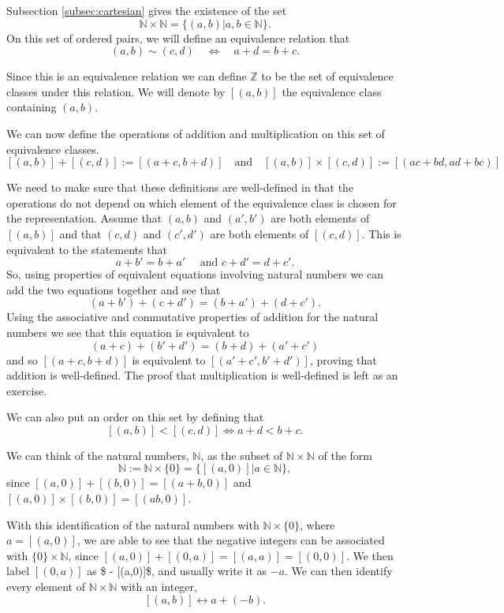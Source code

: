 \documentclass[
]{book}
\theoremstyle{definition}
\theoremstyle{definition}
\theoremstyle{definition}
\theoremstyle{definition}
\theoremstyle{remark}
\begin{document}
Subsection \ref{subsec:cartesian} gives the existence of the set \[\mathbb{N}\times \mathbb{N} = \{ (a,b)  \vert a,b \in \mathbb{N}\}.\] On this set of ordered pairs, we will define an equivalence relation that
\[(a,b)\sim (c,d) \quad \Leftrightarrow \quad  a+d=b+c.\]

Since this is an equivalence relation we can define \(\mathbb{Z}\) to be the set of equivalence classes under this relation. We will denote by \([(a,b)]\) the equivalence class containing \((a,b)\).

We can now define the operations of addition and multiplication on this set of equivalence classes.
\[[(a,b)]+[(c,d)]:= [(a+c,b+d)] \quad \mbox{and} \quad [(a,b)]\times [(c,d)] := [(ac+bd,ad+bc)]\]

We need to make sure that these definitions are well-defined in that the operations do not depend on which element of the equivalence class is chosen for the representation. Assume that \((a,b)\) and \((a',b')\) are both elements of \([(a,b)]\) and that \((c,d)\) and \((c',d')\) are both elements of \([(c,d)]\). This is equivalent to the statements that \[a+b'=b+a' \quad \mbox{ and } c+d'=d+c'.\] So, using properties of equivalent equations involving natural numbers we can add the two equations together and see that \[(a+b') + (c+d') = (b+a')+(d+c').\] Using the associative and commutative properties of addition for the natural numbers we see that this equation is equivalent to \[(a+c) + (b'+d') = (b+d) + (a'+c')\] and so \([(a+c,b+d)]\) is equivalent to \([(a'+c',b'+d')]\), proving that addition is well-defined. The proof that multiplication is well-defined is left as an exercise.

We can also put an order on this set by defining that \[[(a,b)] < [(c,d)] \Leftrightarrow a+d<b+c.\]

We can think of the natural numbers, \(\mathbb{N}\), as the subset of \(\mathbb{N}\times \mathbb{N}\) of the form
\[\mathbb{N} := \mathbb{N} \times \{0\} = \{ [(a,0)] \vert a\in \mathbb{N}\},\] since \([(a,0)]+[(b,0)] = [(a+b,0)]\) and \([(a,0)] \times [(b,0)] = [(ab,0)]\).

With this identification of the natural numbers with \(\mathbb{N}\times \{0\}\), where \(a=[(a,0)]\), we are able to see that the negative integers can be associated with \(\{0\} \times \mathbb{N}\), since \([(a,0)]+[(0,a)] = [(a,a)] = [(0,0)]\). We then label \([(0,a)]\) as \$ - {[}(a,0){]}\$, and usually write it as \(-a\). We can then identify every element of \(\mathbb{N}\times \mathbb{N}\) with an integer,
\[[(a,b)] \leftrightarrow a+(-b).\]
\end{document}
